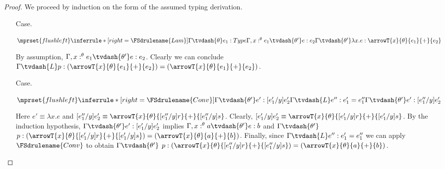 \begin{proof}
  We proceed by induction on the form of the assumed typing derivation.
  \begin{itemize}
  \item[Case.]\ \\
    \begin{center}
      \begin{math}
        $$\mprset{flushleft}
        \inferrule* [right=\FSdrulename{Lam}] {
          \Gamma \tvdash{\theta} e_1:Type
          \\\\
          \Gamma,x:^{\theta} e_1 \tvdash{\theta'} e:e_2
        }{\Gamma \tvdash{\theta'} \lambda x.e:\arrowT{x}{\theta}{e_1}{+}{e_2}}
      \end{math}
    \end{center}
    By assumption, $\Gamma,x:^{\theta} e_1 \tvdash{\theta'} e:e_2$.  Clearly we can conclude
    $\Gamma \tvdash{L} p:(\arrowT{x}{\theta}{e_1}{+}{e_2}) = (\arrowT{x}{\theta}{e_1}{+}{e_2})$.
    
  \item[Case.]\ \\
    \begin{center}
      \begin{math}
        $$\mprset{flushleft}
        \inferrule* [right=\FSdrulename{Conv}] {
          \Gamma \tvdash{\theta'} e':[e'_1/y]e'_2
          \\\\
          \Gamma \tvdash{L} e'':e'_1 = e''_1
        }{\Gamma \tvdash{\theta'} e':[e''_1/y]e'_2}
      \end{math}
    \end{center}
    Here $e' \equiv \lambda x.e$ and 
    $[e''_1/y]e'_2 \equiv \arrowT{x}{\theta}{[e''_1/y]r}{+}{[e''_1/y]s}$.  Clearly,
    $[e'_1/y]e'_2 \equiv \arrowT{x}{\theta}{[e'_1/y]r}{+}{[e'_1/y]s}$.  By the induction
    hypothesis, $\Gamma \tvdash{\theta'} e':[e'_1/y]e'_2$ implies 
    $\Gamma,x:^\theta a \tvdash{\theta'} e:b$ and 
    $\Gamma \tvdash{\theta'} $
    $p:(\arrowT{x}{\theta}{[e'_1/y]r}{+}{[e'_1/y]s}) = (\arrowT{x}{\theta}{a}{+}{b})$.  Finally, 
    since $\Gamma \tvdash{L} e'':e'_1 = e''_1$ we can apply $\FSdrulename{Conv}$ to obtain
    $\Gamma \tvdash{\theta'} $
    $p:(\arrowT{x}{\theta}{[e''_1/y]r}{+}{[e''_1/y]s}) = (\arrowT{x}{\theta}{a}{+}{b})$.
  \end{itemize}
\end{proof}

